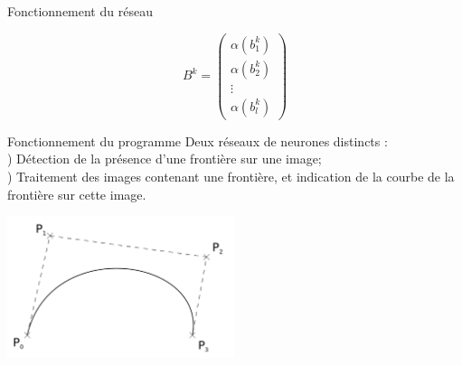 \documentclass[ignorenonframetext,]{beamer}
\begin{document}
\begin{frame}{Fonctionnement du réseau}
\begin{minipage}{0.5\textwidth}
\begin{tikzpicture}
	\end{tikzpicture}
		\[B^k = \begin{pmatrix}
            \alpha(b_1^k) \\
            \alpha(b_2^k) \\
            \vdots \\
            \alpha(b_l^k)
		\end{pmatrix} \]

	\end{minipage}

\end{frame}

\begin{frame}{Fonctionnement du programme}
	Deux réseaux de neurones distincts :\\
	) Détection de la présence d'une frontière sur une image;\\
	) Traitement des images contenant une frontière, et indication de la courbe de la frontière sur cette image.\\
	\begin{center}
		\includegraphics[width=0.5\textwidth]{bezier.png}
	\end{center}
\end{frame}
\end{document}
